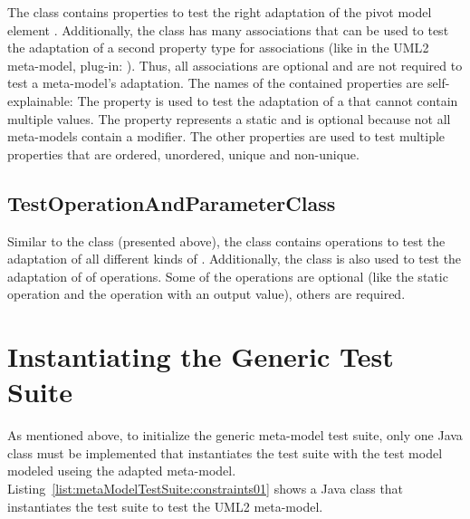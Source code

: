 The class  contains properties to test the right 
adaptation of the pivot model element . Additionally, the class 
has many associations that can be used to test the adaptation of a second
property type for associations (like in the \acs{UML}2 meta-model, plug-in: 
). Thus, all associations are 
optional and are not required to test a meta-model's adaptation. The names of 
the contained properties are self-explainable: The property 
 is used to test the adaptation of a  
that cannot contain multiple values. The property 
represents a static  and is optional because not all meta-models 
contain a  modifier. The other properties are used to test multiple
properties that are ordered, unordered, unique and non-unique.


\subsection{TestOperationAndParameterClass}

Similar to the class  (presented above), the class 
 contains operations to test the 
adaptation of all different kinds of . Additionally, the class
is also used to test the adaptation of  of operations. Some of
the operations are optional (like the static operation and the operation with 
an output value), others are required.


\section{Instantiating the Generic Test Suite}

As mentioned above, to initialize the generic meta-model test suite, only one 
Java class must be implemented that instantiates the test suite with the test 
model modeled useing the adapted meta-model. 
Listing~\ref{list:metaModelTestSuite:constraints01} shows a Java class that 
instantiates the test suite to test the \acs{UML}2 meta-model.

